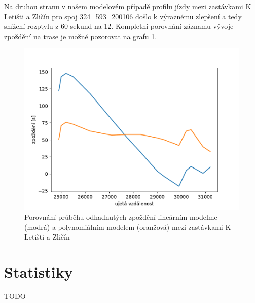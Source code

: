 Na druhou stranu v našem modelovém případě profilu jízdy mezi zastávkami K Letišti a Zličín pro spoj 324\_593\_200106 došlo k výraznému zlepšení a tedy snížení rozptylu z 60 sekund na 12. Kompletní porovnání záznamu vývoje zpoždění na trase je možné pozorovat na grafu \ref{fig:compare_534_421}.

\begin{figure}
	\centering
  \includegraphics[width=1\linewidth]{../img/compare_534_421}
  \caption{Porovnání průběhu odhadnutých zpoždění lineárním modelme (modrá) a polynomiálním modelem (oranžová) mezi zastávkami K Letišti a Zličín}
  \label{fig:compare_534_421}
\end{figure}

\section{Statistiky}

TODO
